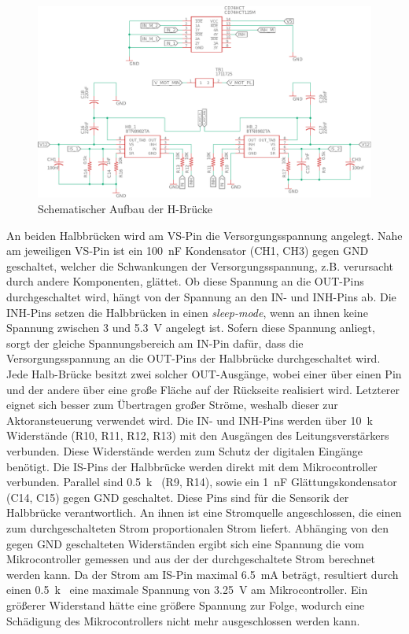 \begin{figure} [H]
	\centering
	\includegraphics[width=1\linewidth]{Bilder/schematisch_hbruecke.pdf}
	\caption{Schematischer Aufbau der H-Brücke}
	\label{fig:schematisch_hbruecke}
\end{figure}\noindent
An beiden Halbbrücken wird am VS-Pin die Versorgungsspannung angelegt. Nahe am jeweiligen VS-Pin ist ein \SI{100}{nF} Kondensator (CH1, CH3) gegen GND geschaltet, welcher die Schwankungen der Versorgungsspannung, z.B. verursacht durch andere Komponenten, glättet. Ob diese Spannung an die OUT-Pins durchgeschaltet wird, hängt von der Spannung an den IN- und INH-Pins ab. Die INH-Pins setzen die Halbbrücken in einen \textit{sleep-mode}, wenn an ihnen keine Spannung zwischen 3 und \SI{5,3}{V} angelegt ist. Sofern diese Spannung anliegt, sorgt der gleiche Spannungsbereich am IN-Pin dafür, dass die Versorgungsspannung an die OUT-Pins der Halbbrücke durchgeschaltet wird. Jede Halb-Brücke besitzt zwei solcher OUT-Ausgänge, wobei einer über einen Pin und der andere über eine große Fläche auf der Rückseite realisiert wird. Letzterer eignet sich besser zum Übertragen großer Ströme, weshalb dieser zur Aktoransteuerung verwendet wird.  Die IN- und INH-Pins werden über \SI{10}{k\Omega} Widerstände (R10, R11, R12, R13) mit den Ausgängen des Leitungsverstärkers verbunden. Diese Widerstände werden zum Schutz der digitalen Eingänge benötigt.
Die IS-Pins der Halbbrücke werden direkt mit dem Mikrocontroller verbunden. Parallel sind \SI{0,5}{k\Omega} (R9, R14), sowie ein  \SI{1}{nF} Glättungskondensator (C14, C15) gegen GND geschaltet. Diese Pins sind für die Sensorik der Halbbrücke verantwortlich. An ihnen ist eine Stromquelle angeschlossen, die einen zum durchgeschalteten Strom proportionalen Strom liefert. Abhänging von den gegen GND geschalteten Widerständen ergibt sich eine Spannung die vom Mikrocontroller gemessen und aus der der durchgeschaltete Strom berechnet werden kann. Da der Strom am IS-Pin maximal \SI{6,5}{mA} beträgt, resultiert durch einen \SI{0,5}{k\Omega} eine maximale Spannung von \SI{3,25}{V} am Mikrocontroller. Ein größerer Widerstand hätte eine größere Spannung zur Folge, wodurch eine Schädigung des Mikrocontrollers nicht mehr ausgeschlossen werden kann. 
